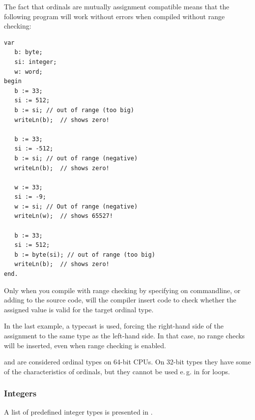 The fact that ordinals are mutually assignment compatible means that the 
following program will work without errors when compiled without range checking:
\begin{verbatim}
var
   b: byte;
   si: integer;
   w: word;
begin
   b := 33;
   si := 512;
   b := si; // out of range (too big)
   writeLn(b);  // shows zero!

   b := 33;
   si := -512;
   b := si; // out of range (negative)
   writeLn(b);  // shows zero!

   w := 33;
   si := -9;
   w := si; // Out of range (negative)
   writeLn(w);  // shows 65527!

   b := 33;
   si := 512;
   b := byte(si); // out of range (too big)
   writeLn(b);  // shows zero!
end.
\end{verbatim}
Only when you compile with range checking by specifying  on commandline, or
adding  to the source code, will the compiler insert code to
check whether the assigned value is valid for the target ordinal type.

In the last example, a typecast is used, forcing the right-hand side of the
assignment to the same type as the left-hand side. In that case, no range
checks will be inserted, even when range checking is enabled.

\begin{remark}
 and  are considered ordinal types on 64-bit CPUs. On 32-bit types
they have some of the characteristics of ordinals, but they cannot be used
e.\,g. in for loops.
\end{remark}

\subsubsection{Integers}
A list of predefined integer types is presented in .

